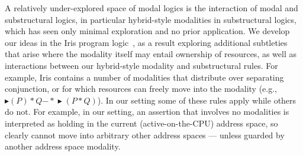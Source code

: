 A relatively under-explored space of modal logics is the interaction of modal and substructural logics, in particular hybrid-style modalities in substructural logics, which has seen only minimal exploration and no prior application. We develop our ideas in the Iris program logic~\cite{jung2018}, as a result exploring additional subtleties that arise where the modality itself may entail ownership of resources, as well as interactions between our hybrid-style modality and substructural rules.  For example, Iris contains a number of modalities that distribute over separating conjunction, or for which resources can freely move into the modality (e.g., $\blacktriangleright(P)\ast Q \mathrel{-\ast} \blacktriangleright(P\ast Q)$). In our setting some of these rules apply while others do not. For example, in our setting, an assertion that involves no modalities is interpreted as holding in the current (active-on-the-CPU) address space, so clearly cannot move into arbitrary other address spaces --- unless guarded by another address space modality.
